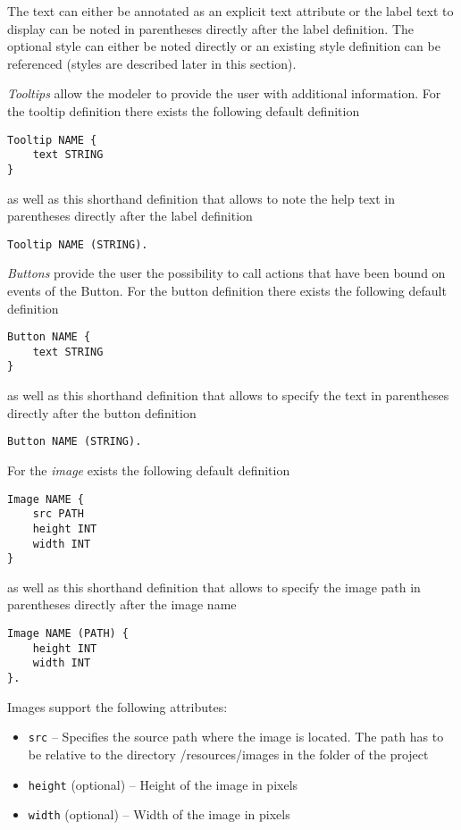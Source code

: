 The text can either be annotated as an explicit text attribute or the label text to display can be noted in parentheses directly after the label definition. The optional style can either be noted directly or an existing style definition can be referenced (styles are described later in this section).

\textit{Tooltips} allow the modeler to provide the user with additional information. For the tooltip definition there exists the following default definition
\begin{lstlisting}
Tooltip NAME {
	text STRING
}
\end{lstlisting}

as well as this shorthand definition that allows to note the help text in parentheses directly after the label definition
\begin{lstlisting}
Tooltip NAME (STRING).
\end{lstlisting}

\textit{Buttons} provide the user the possibility to call actions that have been bound on events of the Button. For the button definition there exists the following default definition
\begin{lstlisting}
Button NAME {
	text STRING
}
\end{lstlisting}
as well as this shorthand definition that allows to specify the text in parentheses directly after the button definition
\begin{lstlisting}
Button NAME (STRING).
\end{lstlisting}


For the \textit{image} exists the following default definition
\begin{lstlisting}
Image NAME {
	src PATH
	height INT
	width INT
}
\end{lstlisting}
as well as this shorthand definition that allows to specify the image path in parentheses directly after the image name
\begin{lstlisting}
Image NAME (PATH) {
	height INT
	width INT
}.
\end{lstlisting}
Images support the following attributes:
\begin{itemize}
\item \lstinline!src! -- Specifies the source path where the image is located. The path has to be relative to the directory /resources/images in the folder of the \MD project
\item \lstinline!height! (optional) -- Height of the image in pixels
\item \lstinline!width! (optional) -- Width of the image in pixels
\end{itemize}

